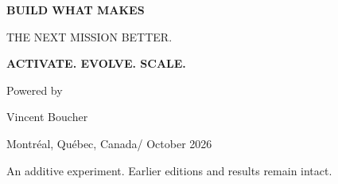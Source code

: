 \begin{titlepage}
\vfill
{\sffamily\large\bfseries BUILD WHAT MAKES\par THE NEXT MISSION BETTER.\par}
\vspace{.55cm}
{\sffamily\large\OmegaHarness\par}
{\sffamily\bfseries\color{gold}ACTIVATE. EVOLVE. SCALE.\par}
\vspace{.35cm}
{\sffamily\small Powered by \TI\par}
\vspace{.6cm}
{\large Vincent Boucher\par}
{\sffamily\small Montr\'eal, Qu\'ebec, Canada\quad / October 2026\par}
\vspace{.3cm}
{\sffamily\scriptsize An additive experiment. Earlier editions and results remain intact.\par}
\end{titlepage}

\clearpage








\clearpage
\begingroup
\raggedright
{}


\endgroup

